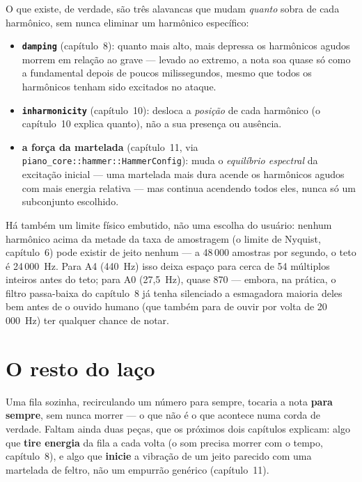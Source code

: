 \documentclass[11pt,oneside]{book}
\begin{document}
O que existe, de verdade, são três alavancas que mudam \emph{quanto} sobra
de cada harmônico, sem nunca eliminar um harmônico específico:

\begin{itemize}
\item \textbf{\texttt{damping}} (capítulo~8): quanto mais alto, mais
depressa os harmônicos agudos morrem em relação ao grave --- levado ao
extremo, a nota soa quase só como a fundamental depois de poucos
milissegundos, mesmo que todos os harmônicos tenham sido excitados no
ataque.
\item \textbf{\texttt{inharmonicity}} (capítulo~10): desloca a
\emph{posição} de cada harmônico (o capítulo~10 explica quanto), não a sua
presença ou ausência.
\item \textbf{a força da martelada} (capítulo~11, via
\texttt{piano\_core::hammer::HammerConfig}): muda o \emph{equilíbrio
espectral} da excitação inicial --- uma martelada mais dura acende os
harmônicos agudos com mais energia relativa --- mas continua acendendo
todos eles, nunca só um subconjunto escolhido.
\end{itemize}

Há também um limite físico embutido, não uma escolha do usuário: nenhum
harmônico acima da metade da taxa de amostragem (o limite de Nyquist,
capítulo~6) pode existir de jeito nenhum --- a 48\,000 amostras por
segundo, o teto é 24\,000~Hz. Para A4 (440~Hz) isso deixa espaço para
cerca de 54 múltiplos inteiros antes do teto; para A0 (27,5~Hz), quase
870 --- embora, na prática, o filtro passa-baixa do capítulo~8 já tenha
silenciado a esmagadora maioria deles bem antes de o ouvido humano (que
também para de ouvir por volta de 20\,000~Hz) ter qualquer chance de
notar.

\section*{O resto do laço}

Uma fila sozinha, recirculando um número para sempre, tocaria a nota
\textbf{para sempre}, sem nunca morrer --- o que não é o que acontece numa
corda de verdade. Faltam ainda duas peças, que os próximos dois capítulos
explicam: algo que \textbf{tire energia} da fila a cada volta (o som
precisa morrer com o tempo, capítulo~8), e algo que \textbf{inicie} a
vibração de um jeito parecido com uma martelada de feltro, não um empurrão
genérico (capítulo~11).

\end{document}

